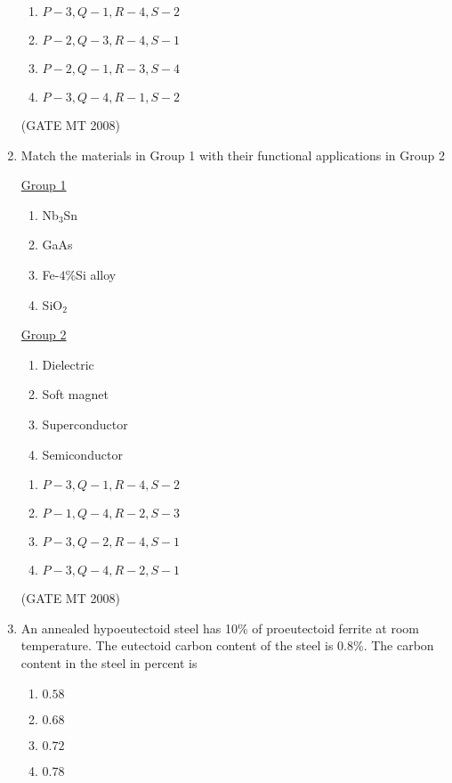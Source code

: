 \documentclass[journal, 11pt, onecolumn]{IEEEtran}
\theoremstyle{remark}
\begin{document}
\begin{enumerate}
\begin{multicols}{2}
\begin{enumerate} 
\item $P-3, Q-1, R-4, S-2$
\item $P-2, Q-3, R-4, S-1$
\item $P-2, Q-1, R-3, S-4$
\item $P-3, Q-4, R-1, S-2$
\end{enumerate}
\end{multicols}
\hfill(GATE MT 2008) 

\item Match the materials in Group 1 with their functional applications in Group 2
\begin{multicols}{2}
\underline{Group 1}
\begin{enumerate}[label=(\Alph*), start=16]
\item Nb$_3$Sn
\item GaAs 
\item Fe-$4$\%Si alloy
\item SiO$_2$
\end{enumerate}

\underline{Group 2}
\begin{enumerate}[label=(\arabic*), start=1]
\item Dielectric
\item Soft magnet
\item Superconductor  
\item Semiconductor
\end{enumerate}
\end{multicols}

\begin{multicols}{2}
\begin{enumerate} 
\item $P-3, Q-1, R-4, S-2$
\item $P-1, Q-4, R-2, S-3$
\item $P-3, Q-2, R-4, S-1$
\item $P-3, Q-4, R-2, S-1$
\end{enumerate}
\end{multicols}
\hfill(GATE MT 2008) 

\item An annealed hypoeutectoid steel has 10\% of proeutectoid ferrite at room temperature. The eutectoid carbon content of the steel is 0.8\%. The carbon content in the steel in percent is

\begin{multicols}{4}
\begin{enumerate} 
\item $0.58$ 
\item $0.68$ 
\item $0.72$ 
\item $0.78$
\end{enumerate}
\end{multicols}


\end{enumerate}
\end{document}
